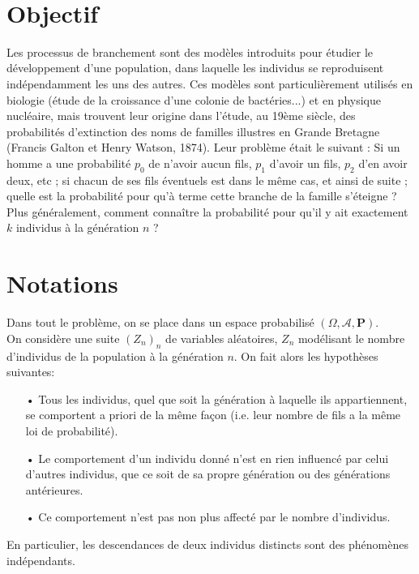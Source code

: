 \documentclass[a4paper,11pt]{article}
\renewcommand{\P}{\mathbf{P}}
\newcommand{\suite}[2]{{\left({#1}_{#2}\right)}_{#2}}
\newcommand{\titre}[1]{
		\colorbox{vert1}{
		\parbox{\headwidth}{
			\center{\Large{\sffamily\bfseries{\color{gris}{#1}}}}\\
			\vspace*{1em}
		}}
	}
\begin{document}
\thispagestyle{empty}				%
\pagecolor{gris}						%
\titre{Processus de branchement}		%
\vspace*{1em}

\section*{Objectif}
Les processus de branchement sont des modèles introduits pour étudier le
développement d’une population, dans laquelle les individus se reproduisent
indépendamment les uns des autres.
Ces modèles sont particulièrement utilisés en biologie (étude de la croissance
d’une colonie de bactéries...) et en physique nucléaire, mais trouvent leur origine
dans l’étude, au 19ème siècle, des probabilités d’extinction des noms de familles
illustres en Grande Bretagne (Francis Galton et Henry Watson, 1874). Leur
problème était le suivant :
Si un homme a une probabilité $p_0$ de n’avoir aucun fils, $p_1$ d’avoir un fils, $p_2$
d’en avoir deux, etc ; si chacun de ses fils éventuels est dans le même cas, et ainsi
de suite ; quelle est la probabilité pour qu’à terme cette branche de la famille
s’éteigne ? Plus généralement, comment connaître la probabilité pour qu’il y ait
exactement $k$ individus à la génération $n$ ?

\section*{Notations}
Dans tout le problème, on se place dans un espace probabilisé $(\Omega,\mathcal{A},\P)$.\\

On considère une suite $\suite{Z}{n}$ de variables aléatoires, $Z_n$ modélisant le nombre d'individus de la population à la génération $n$. On fait alors les hypothèses suivantes:
\begin{itemize}
\item[•] Tous les individus, quel que soit la génération à laquelle ils appartiennent,
se comportent a priori de la même façon (i.e. leur nombre de fils a la
même loi de probabilité).
\item[•] Le comportement d’un individu donné n’est en rien influencé par celui
d’autres individus, que ce soit de sa propre génération ou des générations
antérieures.
\item[•] Ce comportement n’est pas non plus affecté par le nombre d’individus.
\end{itemize}
En particulier, les descendances de deux individus distincts sont des phénomènes
indépendants.
\end{document}
